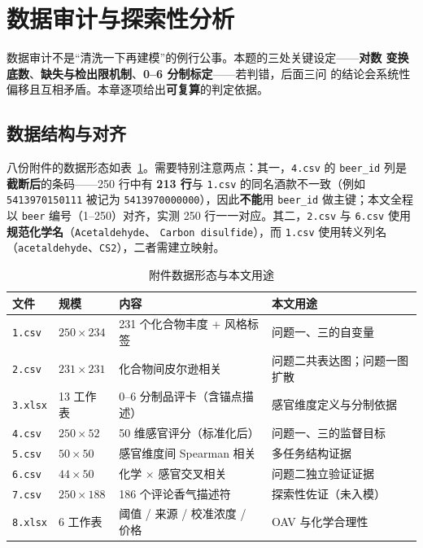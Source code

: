 \section{数据审计与探索性分析}

数据审计不是“清洗一下再建模”的例行公事。本题的三处关键设定——\textbf{对数
变换底数}、\textbf{缺失与检出限机制}、\textbf{0--6 分制标定}——若判错，后面三问
的结论会系统性偏移且互相矛盾。本章逐项给出\textbf{可复算}的判定依据。

\subsection{数据结构与对齐}

八份附件的数据形态如表~\ref{tab:data}。需要特别注意两点：其一，\texttt{4.csv}
的 \texttt{beer\_id} 列是\textbf{截断后}的条码——250 行中有 \textbf{213 行}与
\texttt{1.csv} 的同名酒款不一致（例如 \texttt{5413970150111} 被记为
\texttt{5413970000000}），因此\textbf{不能}用 \texttt{beer\_id} 做主键；本文全程
以 \texttt{beer} 编号（1--250）对齐，实测 250 行一一对应。其二，\texttt{2.csv}
与 \texttt{6.csv} 使用\textbf{规范化学名}（\texttt{Acetaldehyde}、
\texttt{Carbon\ disulfide}），而 \texttt{1.csv} 使用转义列名
（\texttt{acetaldehyde}、\texttt{CS2}），二者需建立映射。

\begin{table}[H]
\centering
\caption{附件数据形态与本文用途}
\label{tab:data}
\small
\begin{fittable}
\begin{tabular}{@{}llll@{}}
\toprule
文件 & 规模 & 内容 & 本文用途 \\
\midrule
\texttt{1.csv} & $250\times234$ & 231 个化合物丰度 + 风格标签 & 问题一、三的自变量 \\
\texttt{2.csv} & $231\times231$ & 化合物间皮尔逊相关 & 问题二共表达图；问题一图扩散 \\
\texttt{3.xlsx} & 13 工作表 & 0--6 分制品评卡（含锚点描述） & 感官维度定义与分制依据 \\
\texttt{4.csv} & $250\times52$ & 50 维感官评分（标准化后） & 问题一、三的监督目标 \\
\texttt{5.csv} & $50\times50$ & 感官维度间 Spearman 相关 & 多任务结构证据 \\
\texttt{6.csv} & $44\times50$ & 化学 $\times$ 感官交叉相关 & 问题二独立验证证据 \\
\texttt{7.csv} & $250\times188$ & 186 个评论香气描述符 & 探索性佐证（未入模） \\
\texttt{8.xlsx} & 6 工作表 & 阈值 / 来源 / 校准浓度 / 价格 & OAV 与化学合理性 \\
\bottomrule
\end{tabular}
\end{fittable}
\end{table}


